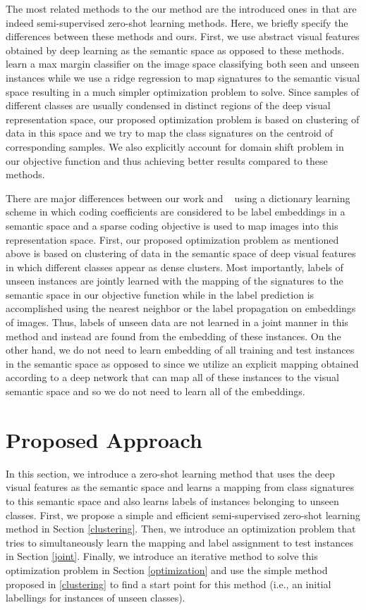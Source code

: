 \documentclass[10pt,twocolumn,letterpaper]{article}
\begin{document}
 The most related methods to the our method are the introduced ones in \cite{li15max, semi15, Kodirov2015} that are indeed semi-supervised zero-shot learning methods. Here, we briefly specify the differences between these methods and ours. First, we use abstract visual features obtained by deep learning as the semantic space as opposed to these methods. \cite{li15max, semi15}
learn a max margin classifier on the image space classifying both seen and unseen instances while we use a ridge regression to map signatures to the semantic visual space resulting in a much simpler optimization problem to solve. Since samples of different classes are usually condensed in distinct regions of the deep visual representation space, our proposed optimization problem is based on clustering of data in this space and we try to map the class signatures on the centroid of corresponding samples. We also explicitly account for domain shift problem in our objective function and thus achieving better results compared to these methods.

There are major differences between our work and ~\cite{Kodirov2015} using a dictionary learning scheme in which coding coefficients are considered to be label embeddings in a semantic space and a sparse coding objective is used to map images into this representation space. First, our proposed optimization problem as mentioned above is based on clustering of data in the semantic space of deep visual features in which different classes appear as dense clusters. Most importantly, labels of unseen instances are jointly learned with the mapping of the signatures to the semantic space in our objective function while in \cite{Kodirov2015} the label prediction is accomplished using the nearest neighbor or the label propagation on embeddings of images. Thus, labels of unseen data are not learned in a joint manner in this method and instead are found from the embedding of these instances. On the other hand, we do not need to learn embedding of all training and test instances in the semantic space as opposed to \cite{Kodirov2015} since we utilize an explicit mapping obtained according to a deep network that can map all of these instances to the visual semantic space and so we do not need to learn all of the embeddings.

\section{Proposed Approach} \label{proposed}
In this section, we introduce a zero-shot learning method that uses the deep visual features as the semantic space and learns a mapping from class signatures to this semantic space and also learns labels of instances belonging to unseen classes. First, we propose a simple and efficient semi-supervised zero-shot learning method in Section \ref{clustering}. Then, we introduce an optimization problem that tries to simultaneously learn the mapping and label assignment to test instances in Section \ref{joint}. Finally, we introduce an iterative method to solve this optimization problem in Section \ref{optimization} and use the simple method proposed in \ref{clustering} to find a start point for this method (i.e., an initial labellings for instances of unseen classes).
\end{document}
